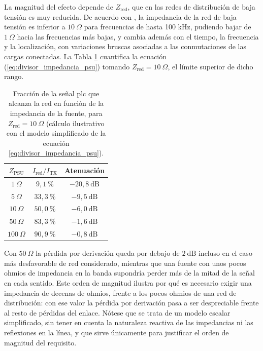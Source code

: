 La magnitud del efecto depende de $Z_{\text{red}}$, que en las redes de distribución de baja tensión es muy reducida. De acuerdo con \cite{6525864}, la impedancia de la red de baja tensión es inferior a $10\ \Omega$ para frecuencias de hasta 100 kHz, pudiendo bajar de $1\ \Omega$ hacia las frecuencias más bajas, y cambia además con el tiempo, la frecuencia y la localización, con variaciones bruscas asociadas a las conmutaciones de las cargas conectadas. La Tabla \ref{tab:efecto_carga_impedancia} cuantifica la ecuación (\ref{eq:divisor_impedancia_psu}) tomando $Z_{\text{red}}=10\ \Omega$, el límite superior de dicho rango.

\begin{table}[!h]
\centering
\small
\begin{tabular}{|c|c|c|}
\hline
\textbf{$Z_{\text{PSU}}$} & \textbf{$I_{\text{red}}/I_{\text{TX}}$} & \textbf{Atenuación} \\ \hline
$1\ \Omega$ & $9{,}1\ \%$ & $-20{,}8\ \text{dB}$ \\ \hline
$5\ \Omega$ & $33{,}3\ \%$ & $-9{,}5\ \text{dB}$ \\ \hline
$10\ \Omega$ & $50{,}0\ \%$ & $-6{,}0\ \text{dB}$ \\ \hline
$50\ \Omega$ & $83{,}3\ \%$ & $-1{,}6\ \text{dB}$ \\ \hline
$100\ \Omega$ & $90{,}9\ \%$ & $-0{,}8\ \text{dB}$ \\ \hline
\end{tabular}
\caption{Fracción de la señal \gls{plc} que alcanza la red en función de la impedancia de la fuente, para $Z_{\text{red}}=10\ \Omega$ (cálculo ilustrativo con el modelo simplificado de la ecuación \ref{eq:divisor_impedancia_psu}).}
\label{tab:efecto_carga_impedancia}
\end{table}

Con $50\ \Omega$ la pérdida por derivación queda por debajo de $2\ \text{dB}$ incluso en el caso más desfavorable de red considerado, mientras que una fuente con unos pocos ohmios de impedancia en la banda supondría perder más de la mitad de la señal en cada sentido. Este orden de magnitud ilustra por qué es necesario exigir una impedancia de decenas de ohmios, frente a los pocos ohmios de una red de distribución: con ese valor la pérdida por derivación pasa a ser despreciable frente al resto de pérdidas del enlace. Nótese que se trata de un modelo escalar simplificado, sin tener en cuenta la naturaleza reactiva de las impedancias ni las reflexiones en la línea, y que sirve únicamente para justificar el orden de magnitud del requisito.

